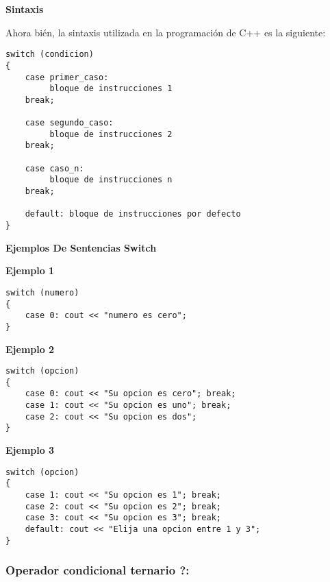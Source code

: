 \begin{center}
	\textbf{Sintaxis}
\end{center}
Ahora bién, la sintaxis utilizada en la programación de C++ es la siguiente:

\begin{lstlisting}[style=Cpp, label=sintaxis-switch, caption=Sintaxis Switch]
switch (condicion)
{
    case primer_caso:
         bloque de instrucciones 1
    break;

    case segundo_caso:
         bloque de instrucciones 2
    break;

    case caso_n:
         bloque de instrucciones n
    break;

    default: bloque de instrucciones por defecto
}
\end{lstlisting}

\begin{center}
	\textbf{Ejemplos De Sentencias Switch}
\end{center}

\textbf{Ejemplo 1}

\begin{lstlisting}[style=Cpp, label=switch-ejemplo-1, caption=Switch Ejemplo 1]
switch (numero)
{
    case 0: cout << "numero es cero";
}
\end{lstlisting}

\textbf{Ejemplo 2}

\begin{lstlisting}[style=Cpp, label=switch-ejemplo-2, caption=Switch Ejemplo 2]
switch (opcion)
{
    case 0: cout << "Su opcion es cero"; break;
    case 1: cout << "Su opcion es uno"; break;
    case 2: cout << "Su opcion es dos";
}
\end{lstlisting}

\textbf{Ejemplo 3}

\begin{lstlisting}[style=Cpp, label=switch-ejemplo-3, caption=Switch Ejemplo 3]
switch (opcion)
{
    case 1: cout << "Su opcion es 1"; break;
    case 2: cout << "Su opcion es 2"; break;
    case 3: cout << "Su opcion es 3"; break;
    default: cout << "Elija una opcion entre 1 y 3";
}
\end{lstlisting}


\subsubsection{Operador condicional ternario ?:}

